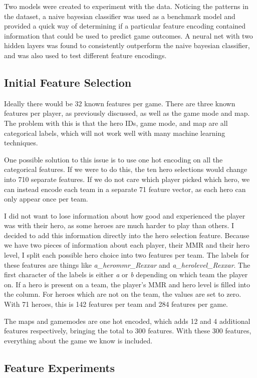 \documentclass[twoside,twocolumn]{article}
\begin{document}
Two models were created to experiment with the data.  Noticing the patterns in the dataset, a naive bayesian classifier was used as a benchmark model and provided a quick way of determining if a particular feature encoding contained information that could be used to predict game outcomes.  A neural net with two hidden layers was found to consistently outperform the naive bayesian classifier, and was also used to test different feature encodings.

\subsection{Initial Feature Selection}

Ideally there would be 32 known features per game.  There are three known features per player, as previously discussed, as well as the game mode and map.  The problem with this is that the hero IDs, game mode, and map are all categorical labels, which will not work well with many machine learning techniques.

One possible solution to this issue is to use one hot encoding on all the categorical features.  If we were to do this, the ten hero selections would change into 710 separate features.  If we do not care which player picked which hero, we can instead encode each team in a separate 71 feature vector, as each hero can only appear once per team. 

I did not want to lose information about how good and experienced the player was with their hero, as some heroes are much harder to play than others.  I decided to add this information directly into the hero selection feature.  Because we have two pieces of information about each player, their MMR and their hero level, I split each possible hero choice into two features per team.  The labels for these features are things like \textit{a\_herommr\_Rexxar} and \textit{a\_herolevel\_Rexxar}.  The first character of the labels is either \textit{a} or \textit{b} depending on which team the player on.  If a hero is present on a team, the player's MMR and hero level is filled into the column.  For heroes which are not on the team, the values are set to zero.  With 71 heroes, this is 142 features per team and 284 features per game.

The maps and gamemodes are one hot encoded, which adds 12 and 4 additional features respectively, bringing the total to 300 features.  With these 300 features, everything about the game we know is included.

\subsection {Feature Experiments}
\end{document}
